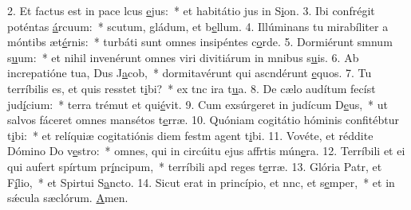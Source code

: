 2. Et factus est in pace lcus \uline{e}jus:~* et habitátio jus in S\uline{i}on.
3. Ibi confrégit poténtas \uline{á}rcuum:~* scutum, gládum, et b\uline{e}llum.
4. Illúminans tu mirabíliter a móntibs æt\uline{é}rnis:~* turbáti sunt omnes insipéntes c\uline{o}rde.
5. Dormiérunt smnum s\uline{u}um:~* et nihil invenérunt omnes viri divitiárum in mnibus s\uline{u}is.
6. Ab increpatióne tua, Dus J\uline{a}cob,~* dormitavérunt qui ascndérunt \uline{e}quos.
7. Tu terríbilis es, et quis resstet t\uline{i}bi?~* ex tnc ira t\uline{u}a.
8. De cælo audítum fecíst jud\uline{í}cium:~* terra trémut et qui\uline{é}vit.
9. Cum exsúrgeret in judícum D\uline{e}us,~* ut salvos fáceret omnes mansétos t\uline{e}rræ.
10. Quóniam cogitátio hóminis confitébtur t\uline{i}bi:~* et relíquiæ cogitatiónis diem festm agent t\uline{i}bi.
11. Vovéte, et réddite Dómino Do v\uline{e}stro:~* omnes, qui in circúitu ejus affrtis mún\uline{e}ra.
12. Terríbili et ei qui aufert spírtum pr\uline{í}ncipum,~* terríbili apd reges t\uline{e}rræ.
13. Glória Patr, et F\uline{í}lio,~* et Spirtui S\uline{a}ncto.
14. Sicut erat in princípio, et nnc, et s\uline{e}mper,~* et in sǽcula sæclórum. \uline{A}men.
